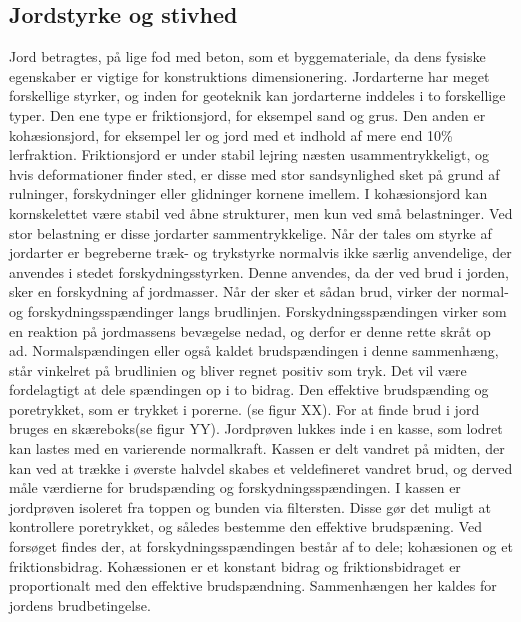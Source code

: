 \subsection{Jordstyrke og stivhed}
Jord betragtes, på lige fod med beton, som et byggemateriale, da dens fysiske egenskaber er vigtige for konstruktions dimensionering. 
\newline \indent{     }  Jordarterne har meget forskellige styrker, og inden for geoteknik kan jordarterne inddeles i to forskellige typer. Den ene type er friktionsjord, for eksempel sand og grus. Den anden er kohæsionsjord, for eksempel ler og jord med et indhold af mere end 10\% lerfraktion. 
Friktionsjord er under stabil lejring næsten usammentrykkeligt, og hvis deformationer finder sted, er disse med stor sandsynlighed sket på grund af rulninger, forskydninger eller glidninger kornene imellem.
\newline \indent{     }  I kohæsionsjord kan kornskelettet være stabil ved åbne strukturer, men kun ved små belastninger. Ved stor belastning er disse jordarter sammentrykkelige.
\newline \indent{     }  Når der tales om styrke af jordarter er begreberne træk- og trykstyrke normalvis ikke særlig anvendelige, der anvendes i stedet forskydningsstyrken. Denne anvendes, da der ved brud i jorden, sker en forskydning af jordmasser. Når der sker et sådan brud, virker der normal- og forskydningsspændinger langs brudlinjen. Forskydningsspændingen virker som en reaktion på jordmassens bevægelse nedad, og derfor er denne rette skråt op ad. Normalspændingen eller også kaldet brudspændingen i denne sammenhæng, står vinkelret på brudlinien og bliver regnet positiv som tryk. Det vil være fordelagtigt at dele spændingen op i to bidrag. Den effektive brudspænding og poretrykket, som er trykket i porerne. (se figur XX). 
\newline
\newline
For at finde brud i jord bruges en skæreboks(se figur YY). Jordprøven lukkes inde i en kasse, som lodret kan lastes med en varierende normalkraft. Kassen er delt vandret på midten, der kan ved at trække i øverste halvdel skabes et veldefineret vandret brud, og derved måle værdierne for brudspænding og forskydningsspændingen.
\newline \indent{     }  I kassen er jordprøven isoleret fra toppen og bunden via filtersten. Disse gør det muligt at kontrollere poretrykket, og således bestemme den effektive brudspæning. Ved forsøget findes der, at forskydningsspændingen består af to dele; kohæsionen og et friktionsbidrag. Kohæssionen er et konstant bidrag og friktionsbidraget er proportionalt med den effektive brudspændning. Sammenhængen her kaldes for jordens brudbetingelse.
